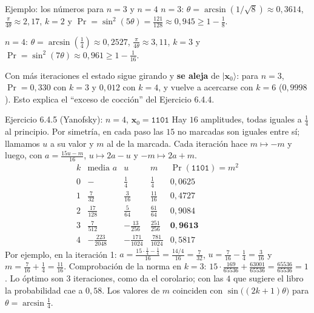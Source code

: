 \documentclass[11pt, a4paper, twoside, openright]{report}
\providecommand{\ket}[1]{|#1\rangle}
\newcommand{\bx}{\mathbf{x}}
\begin{document}
\begin{ejemplo}{Ejemplo: los números para $n = 3$ y $n = 4$}
$n = 3$: $\theta = \arcsin(1/\sqrt8)\approx0{,}3614$, $\frac{\pi}{4\theta}\approx2{,}17$, $k = 2$ y $\Pr = \sin^2(5\theta) = \frac{121}{128}\approx0{,}945\ge1 - \frac18$.

$n = 4$: $\theta = \arcsin(\frac14)\approx0{,}2527$, $\frac{\pi}{4\theta}\approx3{,}11$, $k = 3$ y $\Pr = \sin^2(7\theta)\approx0{,}961\ge1 - \frac{1}{16}$.

Con más iteraciones el estado sigue girando y \textbf{se aleja} de $\ket{\bx_0}$: para $n = 3$, $\Pr = 0{,}330$ con $k = 3$ y $0{,}012$ con $k = 4$, y vuelve a acercarse con $k = 6$ ($0{,}9998$). Esto explica el ``exceso de cocción'' del Ejercicio 6.4.4.
\end{ejemplo}

\begin{ejercicio}{Ejercicio 6.4.5 (Yanofsky): $n = 4$, $\bx_0 = \texttt{1101}$}
Hay $16$ amplitudes, todas iguales a $\frac14$ al principio. Por simetría, en cada paso las $15$ no marcadas son iguales entre sí; llamamos $u$ a su valor y $m$ al de la marcada. Cada iteración hace $m\mapsto -m$ y luego, con $a = \frac{15u - m}{16}$, $u\mapsto2a - u$ y $-m\mapsto 2a + m$.
\[
\renewcommand{\arraystretch}{1.35}
\begin{array}{c|c|c|c|c}
k & \text{media } a & u & m & \Pr(\texttt{1101}) = m^2 \\ \hline
0 & - & \frac14 & \frac14 & 0{,}0625 \\
1 & \frac{7}{32} & \frac{3}{16} & \frac{11}{16} & 0{,}4727 \\
2 & \frac{17}{128} & \frac{5}{64} & \frac{61}{64} & 0{,}9084 \\
3 & \frac{7}{512} & -\frac{13}{256} & \frac{251}{256} & \mathbf{0{,}9613} \\
4 & -\frac{223}{2048} & -\frac{171}{1024} & \frac{781}{1024} & 0{,}5817
\end{array}
\]
Por ejemplo, en la iteración 1: $a = \frac{15\cdot\frac14 - \frac14}{16} = \frac{14/4}{16} = \frac{7}{32}$, $u = \frac{7}{16} - \frac14 = \frac{3}{16}$ y $m = \frac{7}{16} + \frac14 = \frac{11}{16}$. Comprobación de la norma en $k = 3$: $15\cdot\frac{169}{65536} + \frac{63001}{65536} = \frac{65536}{65536} = 1$. Lo óptimo son $3$ iteraciones, como da el corolario; con las $4$ que sugiere el libro la probabilidad cae a $0{,}58$. Los valores de $m$ coinciden con $\sin\big((2k+1)\theta\big)$ para $\theta = \arcsin\frac14$.
\end{ejercicio}
\end{document}
